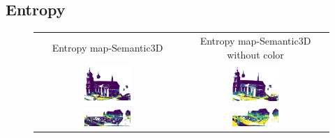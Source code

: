     \subsection{Entropy}
    \begin{figure}[h!]
        \centering
        \begin{tabular}{cc}
            Entropy map-Semantic3D & Entropy map-Semantic3D without color \\
            \includegraphics[width=0.33\textwidth, height=0.18\textheight]{images/ood_imgs/de_sem3d/de_ent_10_1.png}&
            \includegraphics[width=0.33\textwidth, height=0.18\textheight]{images/sem3d_of/de_ent_sem3d_of_1.png}\\

            \includegraphics[width=0.33\textwidth, height=0.18\textheight]{images/ood_imgs/de_sem3d/de_ent_10_2.png}&
            \includegraphics[width=0.33\textwidth, height=0.18\textheight]{images/sem3d_of/de_ent_sem3d_of_2.png}\\


\end{tabular}
\end{figure}
